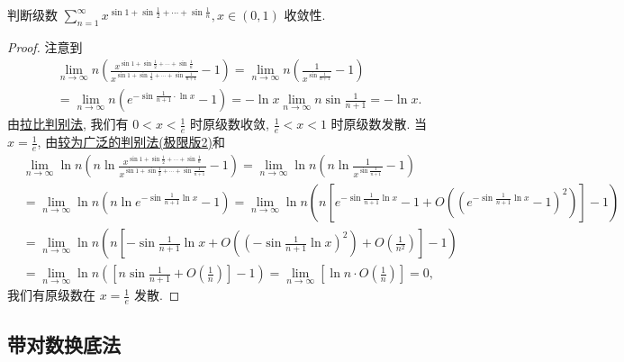 \documentclass[../../main.tex]{subfiles}
\begin{document}
\begin{example}
判断级数 $\sum_{n=1}^{\infty} x^{\sin 1 + \sin \frac{1}{2} + \cdots + \sin \frac{1}{n}}, x \in (0,1)$ 收敛性.
\end{example}
\begin{proof}
注意到
\begin{align*}
&\lim_{n \to \infty} n \left( \frac{x^{\sin 1 + \sin \frac{1}{2} + \cdots + \sin \frac{1}{n}}}{x^{\sin 1 + \sin \frac{1}{2} + \cdots + \sin \frac{1}{n+1}}} - 1 \right) = \lim_{n \to \infty} n \left( \frac{1}{x^{\sin \frac{1}{n+1}}} - 1 \right) \\
&= \lim_{n \to \infty} n \left( e^{-\sin \frac{1}{n+1} \cdot \ln x} - 1 \right) = -\ln x \lim_{n \to \infty} n \sin \frac{1}{n+1} = -\ln x.
\end{align*}
由\hyperref[theorem:拉比判别法]{拉比判别法}, 我们有 $0 < x < \frac{1}{e}$ 时原级数收敛, $\frac{1}{e} < x < 1$ 时原级数发散. 当 $x = \frac{1}{e}$, 由\hyperref[theorem:较为广泛的判别法]{较为广泛的判别法(极限版2)}和
\begin{align*}
&\lim_{n \to \infty} \ln n \left( n \ln \frac{x^{\sin 1 + \sin \frac{1}{2} + \cdots + \sin \frac{1}{n}}}{x^{\sin 1 + \sin \frac{1}{2} + \cdots + \sin \frac{1}{n+1}}} - 1 \right) = \lim_{n \to \infty} \ln n \left( n \ln \frac{1}{x^{\sin \frac{1}{n+1}}} - 1 \right) \\
&= \lim_{n \to \infty} \ln n \left( n \ln e^{-\sin \frac{1}{n+1} \ln x} - 1 \right) = \lim_{n \to \infty} \ln n \left( n \left[ e^{-\sin \frac{1}{n+1} \ln x} - 1 + O \left( \left( e^{-\sin \frac{1}{n+1} \ln x} - 1 \right)^2 \right) \right] - 1 \right) \\
&= \lim_{n \to \infty} \ln n \left( n \left[ -\sin \frac{1}{n+1} \ln x + O \left( \left( -\sin \frac{1}{n+1} \ln x \right)^2 \right) + O \left( \frac{1}{n^2} \right) \right] - 1 \right) \\
&= \lim_{n \to \infty} \ln n \left( \left[ n \sin \frac{1}{n+1} + O \left( \frac{1}{n} \right) \right] - 1 \right) = \lim_{n \to \infty} \left[ \ln n \cdot O \left( \frac{1}{n} \right) \right] = 0,
\end{align*}
我们有原级数在 $x = \frac{1}{e}$ 发散.
\end{proof}



\subsection{带对数换底法}
\end{document}
